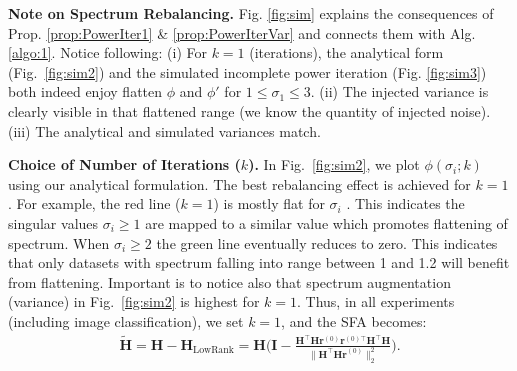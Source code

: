 \begin{tcolorbox}[width=1.0\linewidth, colframe=blackish, colback=beaublue, boxsep=0mm, arc=2mm, left=2mm, right=2mm, top=2mm, bottom=2mm]
\textbf{Note on Spectrum Rebalancing.}
Fig. \ref{fig:sim} explains the consequences of  Prop. \ref{prop:PowerIter1} \& \ref{prop:PowerIterVar} and connects them with Alg. \ref{algo:1}. Notice following: (i) For $k=1$ (iterations), the analytical form (Fig.~\ref{fig:sim2}) and the simulated incomplete power iteration (Fig. \ref{fig:sim3}) both indeed enjoy flatten $\phi$ and $\phi'$ for $1\leq\sigma_1\leq 3$. (ii) The injected variance is clearly visible in that flattened range (we know the quantity of injected noise). (iii) The analytical and simulated variances match.
\end{tcolorbox}

\begin{tcolorbox}[width=1.0\linewidth, colframe=blackish, colback=beaublue, boxsep=0mm, arc=2mm, left=2mm, right=2mm, top=2mm, bottom=2mm]
\textbf{Choice of Number of Iterations ($k$).}
In Fig.~\ref{fig:sim2}, we plot $\phi(\sigma_i;k)$ using our analytical formulation. The best rebalancing effect is achieved for $k=1$ . For example, the red line ($k=1$) is mostly flat for $\sigma_i$ . This indicates the singular values $\sigma_i \geq 1$ are mapped to a similar value which promotes flattening of spectrum. When $\sigma_i \geq 2$ the green line eventually reduces to zero. This indicates that only datasets with spectrum falling into range between 1 and 1.2 will benefit from flattening. Important is to notice also that spectrum augmentation (variance) in Fig.~\ref{fig:sim2} is highest for $k=1$. Thus, in all experiments (including image classification), we set $k=1$, and the SFA becomes:
\vspace{-0.2cm}
\begin{equation}
\label{equ:FA_k=1}
\!\!\begin{aligned}
         \widetilde{\mathbf{H}} \!=\! \mathbf{H}\! -\!\mathbf{H}_{\text{LowRank}} \!=\!\mathbf{H}\bigg(\mathbf{I}\!-\!\frac{\mathbf{H}^{\top} \mathbf{H} \mathbf{r}^{(0)} \mathbf{r}^{(0) \top} \mathbf{H}^{\top} \mathbf{H}}{\|\mathbf{H}^{\top} \mathbf{H r}^{(0)}\|_2^2}\bigg).
    \end{aligned}\!\!\!\!\!
\end{equation}
\end{tcolorbox}


